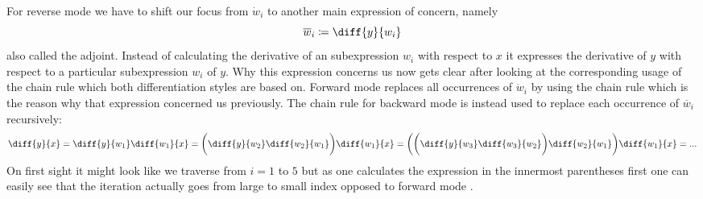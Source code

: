 \newcommand{\overw}[1]{\overline{w}_#1}
\newcommand{\diffyw}[1]{\diff{y}{w_#1}}
For reverse mode we have to shift our focus from $\dot w_i$ to another main expression of concern, namely
\[ \overw{i} \coloneqq \diffyw{i} \]
also called the adjoint. Instead of calculating the derivative of an subexpression $w_i$ with respect to $x$ it expresses the derivative of $y$ with respect to a particular subexpression $w_i$ of $y$. Why this expression concerns us now gets clear after looking at the corresponding usage of the chain rule  which both differentiation styles are based on. Forward mode replaces all occurrences of $\dot w_i$ by using the chain rule which is the reason why that expression concerned us previously. The chain rule for backward mode is instead used to replace each occurrence of $\overw{i}$ recursively:
\newcommand{\diffw}[2]{\diff{w_#1}{w_#2}}
\[ \diff{y}{x} = \diffyw{1}\diff{w_1}{x} = \bigg(\diffyw{2}\diffw{2}{1}\bigg)\diff{w_1}{x} = \bigg(\bigg(\diffyw{3}\diffw{3}{2}\bigg)\diffw{2}{1}\bigg)\diff{w_1}{x} = ... \]
On first sight it might look like we traverse from $i = 1$ to $5$ but as one calculates the expression in the innermost parentheses first one can easily see that the iteration actually goes from large to small index opposed to forward mode \todogrammar.

